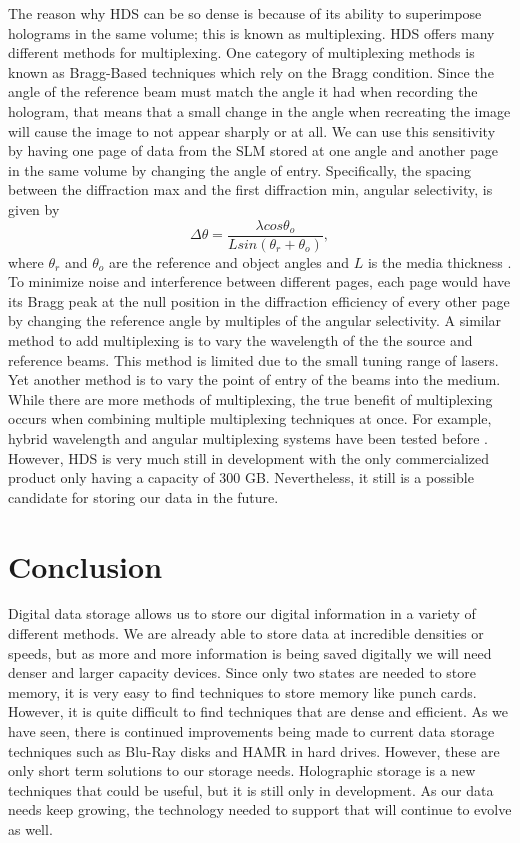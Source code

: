 \documentclass[ notitlepage, numerical, 11pt]{revtex4-1} %
\begin{document}
The reason why HDS can be so dense is because of its ability to superimpose holograms in the same volume; this is known as multiplexing. HDS offers many different methods for multiplexing. One category of multiplexing methods is known as Bragg-Based techniques which rely on the Bragg condition. Since the angle of the reference beam must match the angle it had when recording the hologram, that means that a small change in the angle when recreating the image will cause the image to not appear sharply or at all. We can use this sensitivity by having one page of data from the SLM stored at one angle and another page in the same volume by changing the angle of entry. Specifically, the spacing between the diffraction max and the first diffraction min, angular selectivity, is given by
\begin{equation}
\Delta \theta = \frac{\lambda cos\theta_o}{Lsin(\theta_r + \theta_o)},
\label{angular}
\end{equation}
where $\theta_r$ and $\theta_o$ are the reference and object angles and $L$ is the media thickness \cite{HDS}. To minimize noise and interference between different pages, each page would have its Bragg peak at the null position in the diffraction efficiency of every other page by changing the reference angle by multiples of the angular selectivity. A similar method to add multiplexing is to vary the wavelength of the the source and reference beams. This method is limited due to the small tuning range of lasers. Yet another method is to vary the point of entry of the beams into the medium. While there are more methods of multiplexing, the true benefit of multiplexing occurs when combining multiple multiplexing techniques at once. For example, hybrid wavelength and angular multiplexing systems have been tested before \cite{memory}. However, HDS is very much still in development with the only commercialized product only having a capacity of 300 GB. Nevertheless, it still is a possible candidate for storing our data in the future.

\section{Conclusion}
Digital data storage allows us to store our digital information in a variety of different methods. We are already able to store data at incredible densities or speeds, but as more and more information is being saved digitally we will need denser and larger capacity devices. Since only two states are needed to store memory, it is very easy to find techniques to store memory like punch cards. However, it is quite difficult to find techniques that are dense and efficient. As we have seen, there is continued improvements being made to current data storage techniques such as Blu-Ray disks and HAMR in hard drives. However, these are only short term solutions to our storage needs. Holographic storage is a new techniques that could be useful, but it is still only in development. As our data needs keep growing, the technology needed to support that will continue to evolve as well.
\end{document}

